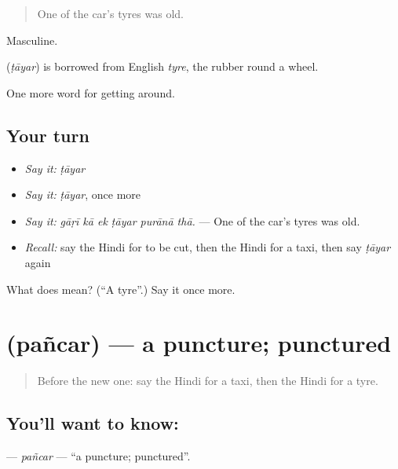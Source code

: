 \begin{quote}
One of the car's tyres was old.
\end{quote}

Masculine.

\begin{cousinweb}
\textbf{} (\emph{ṭāyar}) is borrowed from English \emph{tyre}, the rubber round a wheel.
\end{cousinweb}

\begin{grammarlens}[title={What you've built}]
One more word for getting around.
\end{grammarlens}

\subsection*{Your turn}
\begin{itemize}
\raggedright
  \item \emph{Say it:} \emph{ṭāyar}
  \item \emph{Say it:} \emph{ṭāyar}, once more
  \item \emph{Say it:} \emph{gāṛī kā ek ṭāyar purānā thā.} — One of the car's tyres was old.
  \item \emph{Recall:} say the Hindi for to be cut, then the Hindi for a taxi, then say \emph{ṭāyar} again
\end{itemize}

\begin{tcolorbox}[breakable,colback=teal!4,colframe=teal!35!black,title={Before you move on}]
What does  mean? (\textquotedblleft{}A tyre\textquotedblright{}.) Say it once more.
\end{tcolorbox}
\section[\texorpdfstring{\hi{पंचर} (pañcar)}{पंचर (pañcar)}]{ (pañcar) — a puncture; punctured}

\label{lesson:HI-C406-pancar}



\begin{quote}
Before the new one: say the Hindi for a taxi, then the Hindi for a tyre.
\end{quote}

\subsection*{You'll want to know: }
\textbf{} — \emph{pañcar} — \textquotedblleft{}a puncture; punctured\textquotedblright{}.

